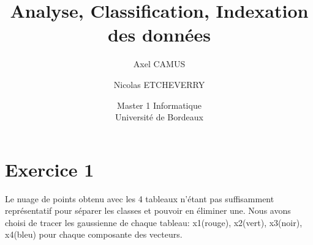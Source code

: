 \documentclass{article}
\begin{document}
\begin{titlepage}
\lstset{language=C}
\title{Analyse, Classification, Indexation des données}
\author{Axel CAMUS
\and
Nicolas ETCHEVERRY}
\date{Master 1 Informatique\\ Université de Bordeaux}
\maketitle
\end{titlepage}

\section{Exercice 1}

Le nuage de points obtenu avec les 4 tableaux n'étant pas suffisamment représentatif pour séparer les classes et pouvoir en éliminer une. Nous avons choisi de tracer les gaussienne de chaque tableau: x1(rouge), x2(vert), x3(noir), x4(bleu) pour chaque composante des vecteurs.
\end{document}
